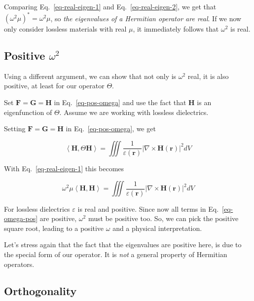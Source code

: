 Comparing Eq.~\ref{eq-real-eigen-1} and Eq.~\ref{eq-real-eigen-2}, we get that $(\omega^2 \mu)^* = \omega^2 \mu$, so \emph{the eigenvalues of a Hermitian operator are real}. If we now only consider lossless materials with real $\mu$, it immediately follows that $\omega^2$ is real.

\subsection{Positive $\omega^2$}

Using a different argument, we can show that not only is $\omega^2$ real, it is also positive, at least for our operator $\Theta$.

\begin{cue}
Set ${\mathbf F}={\mathbf G}={\mathbf H}$ in Eq.~\ref{eq-pos-omega} and use the fact that $\mathbf H$ is an eigenfunction of $\Theta$. Assume we are working with lossless dielectrics.
\end{cue}

Setting ${\mathbf F}={\mathbf G}={\mathbf H}$ in Eq.~\ref{eq-pos-omega}, we get

\begin{equation}
\left\langle {\mathbf H}, \Theta {\mathbf H}\right\rangle = \iiint \frac{1}{\varepsilon({\mathbf r})} \left | \nabla \times {\mathbf H({\mathbf r})} \right |^2  dV 
\label{eq-rot-H-bis}
\end{equation} 

With Eq.~\ref{eq-real-eigen-1} this becomes

\begin{equation}
\omega^2 \mu \left\langle {\mathbf H} , {\mathbf H}\right\rangle = \iiint \frac{1}{\varepsilon({\mathbf r})} \left | \nabla \times {\mathbf H({\mathbf r})} \right |^2  dV \label{eq-omega-pos}
\end{equation} 

For lossless dielectrics $\varepsilon$ is real and positive. Since now all terms in Eq.~\ref{eq-omega-pos} are positive, $\omega^2$ must be positive too. So, we can pick the positive square root, leading to a positive $\omega$ and a physical interpretation.

Let's stress again that the fact that the eigenvalues are positive here, is due to the special form of our operator. It is \emph{not} a general property of Hermitian operators.

\pagebreak

\subsection{Orthogonality}

